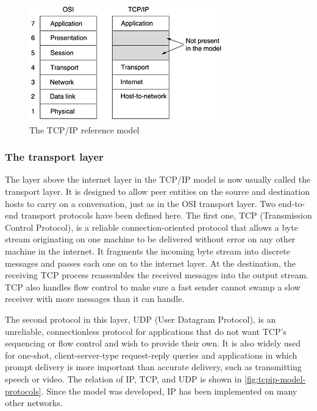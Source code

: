 \begin{figure}
   \centering
   \includegraphics[width=.8\textwidth]{images/01fig21.png}
   \caption{The TCP/IP reference model}
   \label{fig:tcpip-model}
\end{figure}


\subsubsection{The transport layer}

The layer above the internet layer in the TCP/IP model is now usually
called the {transport layer}. It is designed to allow peer entities on
the source and destination hosts to carry on a conversation, just as in
the OSI transport layer. Two end-to-end transport protocols have been
defined here. The first one, {TCP} ({Transmission Control Protocol}), is
a reliable connection-oriented protocol that allows a byte stream
originating on one machine to be delivered without error on any other
machine in the internet. It fragments the incoming byte stream into
discrete messages and passes each one on to the internet layer. At the
destination, the receiving TCP process reassembles the received messages
into the output stream. TCP also handles flow control to make sure a
fast sender cannot swamp a slow receiver with more messages than it can
handle.

The second protocol in this layer, {UDP} ({User Datagram Protocol}), is
an unreliable, connectionless protocol for applications that do not want
TCP's sequencing or flow control and wish to provide their own. It is
also widely used for one-shot, client-server-type request-reply queries
and applications in which prompt delivery is more important than
accurate delivery, such as transmitting speech or video. The relation of
IP, TCP, and UDP is shown in \cref{fig:tcpip-model-protocols}.
Since the model was developed, IP has been implemented on many other networks.



